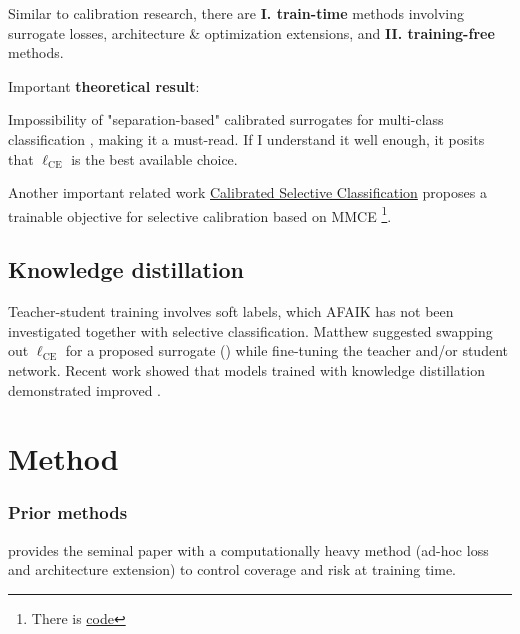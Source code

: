 \noindent Similar to calibration research, there are \textbf{I. train-time} methods involving surrogate losses, architecture \& optimization extensions, and \textbf{II. training-free} methods.

\noindent Important \textbf{theoretical result}:

Impossibility of "separation-based" calibrated surrogates for multi-class classification \cite[Theorem 4]{ni2019calibration}, making it a must-read. If I understand it well enough, it posits that $\ell_{\mathrm{CE}}$ is the best available choice. 

Another important related work \href{https://arxiv.org/pdf/2208.12084.pdf}{Calibrated Selective Classification} \cite{fisch2022calibrated} proposes a trainable objective for selective calibration based on MMCE \cite{kumar2018trainable} \footnote{There is \href{https://github.com/ajfisch/calibrated-selective-classification}{code}}.


\subsection{Knowledge distillation}

Teacher-student training involves soft labels, which AFAIK has not been investigated together with selective classification. Matthew suggested swapping out $\ell_{\mathrm{CE}}$ for a proposed surrogate () while fine-tuning the teacher and/or student network. 
Recent work \cite{galil2023what} showed that models trained with knowledge distillation demonstrated improved \AURC{}.


\section{Method}\label{sec:method}

\subsubsection{Prior methods}

\cite{geifman2017selective,geifman2018bias} provides the seminal paper with a computationally heavy method (ad-hoc loss and architecture extension) to control coverage and risk at training time.

